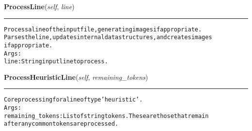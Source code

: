 \hspace{.8\funcindent}\begin{boxedminipage}{\funcwidth}

    \raggedright \textbf{ProcessLine}(\textit{self}, \textit{line})

    \vspace{-1.5ex}

    \rule{\textwidth}{0.5\fboxrule}
\setlength{\parskip}{2ex}
\begin{alltt}

Process a line of the input file, generating images if appropriate.
Parses the line, updates internal data structures, and creates images
if appropriate.
Args:
  line: String input line to process.
\end{alltt}

\setlength{\parskip}{1ex}
    \end{boxedminipage}

    \label{coinor:grumpy:BB:BBTree:ProcessHeuristicLine}

    \vspace{0.5ex}

\hspace{.8\funcindent}\begin{boxedminipage}{\funcwidth}

    \raggedright \textbf{ProcessHeuristicLine}(\textit{self}, \textit{remaining\_tokens})

    \vspace{-1.5ex}

    \rule{\textwidth}{0.5\fboxrule}
\setlength{\parskip}{2ex}
\begin{alltt}

Core processing for a line of type 'heuristic'.
Args:
  remaining\_tokens: List of string tokens. These are those that remain
    after any common tokens are processed.
\end{alltt}

\setlength{\parskip}{1ex}
    \end{boxedminipage}

    \label{coinor:grumpy:BB:BBTree:ProcessIntegerLine}

